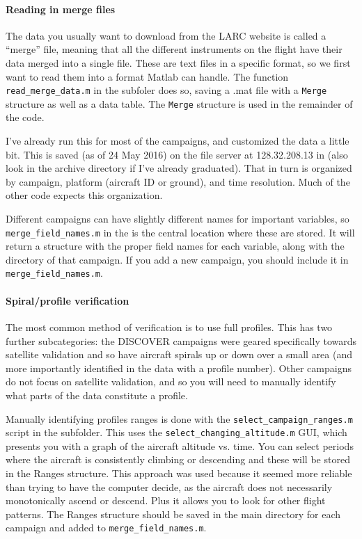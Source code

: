 \documentclass[12pt]{article}
\begin{document}
		\paragraph{Reading in merge files}
		
		The data you usually want to download from the LARC website is called a ``merge'' file, meaning that all the different instruments on the flight have their data merged into a single file. These are text files in a specific format, so we first want to read them into a format Matlab can handle.  The function \lstinline$read_merge_data.m$ in the  subfoler does so, saving a .mat file with a \lstinline$Merge$ structure as well as a data table. The \lstinline$Merge$ structure is used in the remainder of the code.
		
		I've already run this for most of the campaigns, and customized the data a little bit. This is saved (as of 24 May 2016) on the file server at 128.32.208.13 in  (also look in the archive directory if I've already graduated). That in turn is organized by campaign, platform (aircraft ID or ground), and time resolution. Much of the other code expects this organization. 
		
		Different campaigns can have slightly different names for important variables, so \lstinline$merge_field_names.m$ in the  is the central location where these are stored. It will return a structure with the proper field names for each variable, along with the directory of that campaign. If you add a new campaign, you should include it in \lstinline$merge_field_names.m$.
		
		\paragraph{Spiral/profile verification}
		
		The most common method of verification is to use full profiles. This has two further subcategories: the DISCOVER campaigns were geared specifically towards satellite validation and so have aircraft spirals up or down over a small area (and more importantly identified in the data with a profile number).  Other campaigns do not focus on satellite validation, and so you will need to manually identify what parts of the data constitute a profile.
		
		Manually identifying profiles ranges is done with the \lstinline$select_campaign_ranges.m$ script in the  subfolder. This uses the \lstinline$select_changing_altitude.m$ GUI, which presents you with a graph of the aircraft altitude vs. time. You can select periods where the aircraft is consistently climbing or descending and these will be stored in the Ranges structure. This approach was used because it seemed more reliable than trying to have the computer decide, as the aircraft does not necessarily monotonically ascend or descend. Plus it allows you to look for other flight patterns. The Ranges structure should be saved in the main directory for each campaign and added to \lstinline$merge_field_names.m$.
		
\end{document}
